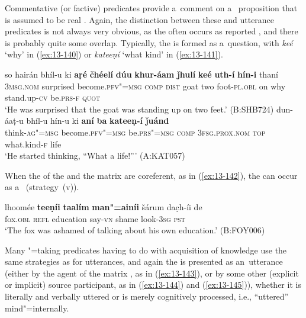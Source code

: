  Commentative (or factive) predicates provide a~comment on a~ proposition that is assumed to be real \citep[127--129]{noonan2007}. Again, the distinction between these and utterance predicates is not always very obvious, as the  often occurs as reported , and there is probably quite some overlap. Typically, the  is formed as a~question, with \textit{keé} `why' in (\ref{ex:13-140}) or \textit{kateeṇí} `what kind' in (\ref{ex:13-141}).

\ea
\label{ex:13-140}
\gll so hairán bhíl-u ki \textbf{aṛé} \textbf{čhéelí} \textbf{dúu} \textbf{khur-áam} \textbf{ǰhulí} \textbf{keé} \textbf{uth-í} \textbf{hín-i} thaní\\
\textsc{3msg.nom}  surprised become.\textsc{pfv"=msg} \textsc{comp} \textsc{dist} goat  two foot-\textsc{pl.obl} on why stand.up-\textsc{cv} be.\textsc{prs-f} \textsc{quot} \\
\glt `He was surprised that the goat was standing up on two feet.' (B:SHB724)
\ex
\label{ex:13-141}
\gll dun-áaṭ-u bhíl-u hín-u ki \textbf{aní} \textbf{ba} \textbf{kateeṇ-í} \textbf{ǰuánd}\\
think-\textsc{ag"=msg} become.\textsc{pfv"=msg} be.\textsc{prs"=msg} \textsc{comp} \textsc{3fsg.prox.nom} \textsc{top} what.kind-\textsc{f} life\\
\glt `He started thinking, ``What a life!''' (A:KAT057) 
\z

When the  of the  and the matrix  are coreferent, as in (\ref{ex:13-142}), the  can occur as a~ (strategy~(v)).

\begin{exe}
\ex
\label{ex:13-142}
\gll lhoomée \textbf{teeṇíi} \textbf{taalím} \textbf{man"=ainíi} šárum  dac̣h-íi de \\
fox.\textsc{obl} \textsc{ refl} education say-\textsc{vn} shame look-\textsc{3sg} \textsc{pst} \\
\glt `The fox was ashamed of talking about his own education.' (B:FOY006) 
\end{exe}

 Many "=taking predicates having to do with acquisition of knowledge use the same strategies as for utterances, and again the  is presented as an~utterance (either by the agent of the matrix , as in (\ref{ex:13-143}), or by some other (explicit or implicit) source participant, as in (\ref{ex:13-144}) and (\ref{ex:13-145})), whether it is literally and verbally uttered or is merely cognitively processed, i.e., ``uttered'' mind"=internally. 

